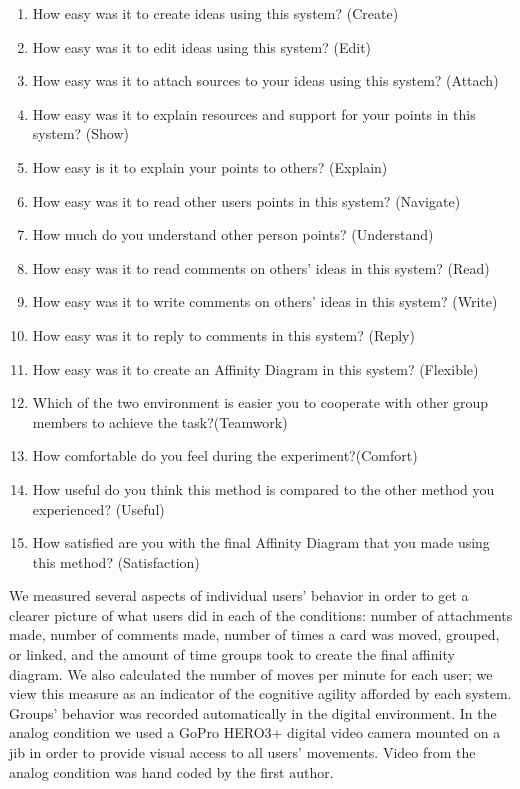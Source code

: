 \documentclass{sigchi}
\begin{document}
\begin{enumerate}
  \item How easy was it to create ideas using this system? (Create)
  \item How easy was it to edit ideas using this system? (Edit)
  \item How easy was it to attach sources to your ideas using this system? (Attach)
  \item How easy was it to explain resources and support for your points in this system? (Show)
  \item How easy is it to explain your points to others? (Explain)
  \item How easy was it to read other users points in this system? (Navigate)
  \item How much do you understand other person points? (Understand)
  \item How easy was it to read comments on others' ideas in this system? (Read)
  \item How easy was it to write comments on others' ideas in this system? (Write)
  \item How easy was it to reply to comments in this system? (Reply)
  \item How easy was it to create an Affinity Diagram in this system? (Flexible)
  \item Which of the two environment is easier  you to cooperate with other group members to achieve the task?(Teamwork)
  \item How comfortable do you feel during the experiment?(Comfort)
  \item How useful do you think this method is compared to the other method you experienced? (Useful)
  \item How satisfied are you with the final Affinity Diagram that you made using this method? (Satisfaction)
\end{enumerate}

We measured several aspects of individual users' behavior in order to get a clearer picture of what users did in each of the conditions: number of attachments made, number of comments made, number of times a card was moved, grouped, or linked, and the amount of time groups took to create the final affinity diagram. We also calculated the number of moves per minute for each user; we view this measure as an indicator of the cognitive agility afforded by each system. Groups' behavior was recorded automatically in the digital environment. In the analog condition we used a GoPro HERO3+ digital video camera mounted on a jib in order to provide visual access to all users' movements. Video from the analog condition was hand coded by the first author.
\end{document}
